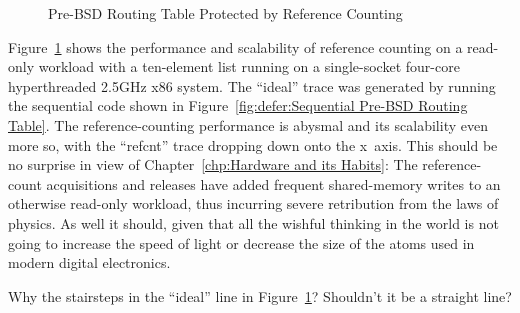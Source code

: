 \begin{figure}[tb]
\centering
{}
\caption{Pre-BSD Routing Table Protected by Reference Counting}
\label{fig:defer:Pre-BSD Routing Table Protected by Reference Counting}
\end{figure}

Figure~\ref{fig:defer:Pre-BSD Routing Table Protected by Reference Counting}
shows the performance and scalability of reference counting on a
read-only workload with a ten-element list running on a
single-socket four-core hyperthreaded 2.5GHz x86 system.
The ``ideal'' trace was generated by running the sequential code shown in
Figure~\ref{fig:defer:Sequential Pre-BSD Routing Table}.
The reference-counting performance is abysmal and its scalability even
more so, with the ``refcnt'' trace dropping down onto the x~axis.
This should be no surprise in view of
Chapter~\ref{chp:Hardware and its Habits}:
The reference-count acquisitions and releases have added frequent
shared-memory writes to an otherwise read-only workload, thus
incurring severe retribution from the laws of physics.
As well it should, given that all the wishful thinking in the world
is not going to increase the speed of light or decrease the size of
the atoms used in modern digital electronics.

\QuickQuiz{}
	Why the stairsteps in the ``ideal'' line in
	Figure~\ref{fig:defer:Pre-BSD Routing Table Protected by Reference Counting}?
	Shouldn't it be a straight line?
 \QuickQuizEnd

